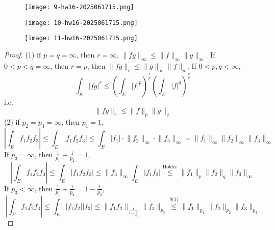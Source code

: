 \begin{exercise}
\begin{figure}[H]
\centering
\texttt{[image: 9-hw16-2025061715.png]}
\label{}
\end{figure}
\begin{figure}[H]
\centering
\texttt{[image: 10-hw16-2025061715.png]}
\label{}
\end{figure}
\begin{figure}[H]
\centering
\texttt{[image: 11-hw16-2025061715.png]}
\label{}
\end{figure}
\end{exercise}
\begin{proof}
(1) if $p=q=\infty$, then $r=\infty$, $\lVert fg \rVert_{\infty}\leq\lVert f \rVert_{\infty}\lVert g \rVert_{\infty}$. If $0<p<q=\infty$, then $r=p$, then $\lVert fg \rVert_{r}\leq \lVert g \rVert_{\infty}\lVert f \rVert_{p}$. If $0<p,q<\infty$,
\[
\int_{E}^{} \lvert fg \rvert ^{r}\leq \left( \int_{E}^{} \lvert f \rvert ^{p} \right)^{\frac{r}{p}}\left( \int_{E}^{} \lvert f \rvert ^{q} \right)^{\frac{r}{q}}
\]
i.e.
\[
\lVert fg \rVert _{r}\leq \lVert f \rVert _{p}\lVert g \rVert _{q}
\]
(2) if $p_2=p_3=\infty$, then $p_1=1$,
\[
\left\lvert  \int_{E}^{} f_1f_2f_3  \right\rvert \leq \int_{E}\lvert f_1f_2f_3 \rvert \leq \int_{E}^{} \lvert f_1 \rvert \cdot \lVert f_2 \rVert _{\infty}\cdot \lVert f_3 \rVert _{\infty}=\lVert f_1 \rVert _{\infty}\lVert f_2 \rVert _{\infty}\lVert f_3 \rVert _{\infty}
\]
If $p_3=\infty$, then $\frac{1}{p_1}+\frac{1}{p_2}=1$,
\[
\left\lvert  \int_{E}^{} f_1f_2f_3  \right\rvert\leq \int_{E}^{} \lvert f_1f_2f_3 \rvert \leq \lVert f_3 \rVert _{\infty}\int_{E}\lvert f_1f_2 \rvert \overset{ \text{Holder} }{ \leq  }\lVert f_1 \rVert _{p}\lVert f_2 \rVert _{q}\lVert f_3 \rVert _{\infty}
\]
If $p_3<\infty$, then $\frac{1}{p_1}+\frac{1}{p_2}=1-\frac{1}{p_3}$,
\[
\left\lvert  \int_{E}f_1f_2f_3  \right\rvert\leq \int_{E}^{} \lvert f_1f_2 \rvert \lvert f_3 \rvert \leq \lVert f_1f_2 \rVert _{\frac{1}{1-\frac{1}{p_3}}}\lVert f_3 \rVert _{p_3}\overset{ \text{9(1)} }{ \leq  }\lVert f_1 \rVert _{p_1}\lVert f_2 \rVert _{p_2}\lVert f_3 \rVert _{p_3}
\]
\end{proof}

